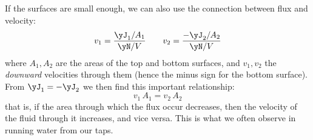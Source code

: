 \medskip

If the surfaces are small enough, we can also use the {connection between flux and velocity}:
\begin{equation*}
  v_{1} = \frac{\yJ_{1}/A_{1}}{\yN/V}
  \qquad
  v_{2} = \frac{-\yJ_{2}/A_{2}}{\yN/V}
\end{equation*}
where $A_{1}, A_{2}$ are  the areas  of the top and bottom surfaces, and $v_{1}, v_{2}$ the \emph{downward} velocities through them (hence the minus sign for the bottom surface). From $\yJ_{1} = -\yJ_{2}$ we then find this important relationship:
\begin{equation*}
  v_{1}\,A_{1} = v_{2}\,A_{2}
\end{equation*}
that is, if the area through which the flux occur decreases, then the velocity of the fluid through it increases, and vice versa.
%
%
This is  what we often observe in running water from our taps.

\bigskip





\printpagenotes*
\clearpage
{}
\label{ncha:bal_energy}

\printpagenotes*
\clearpage
{}
\label{ncha:bal_momentum}

